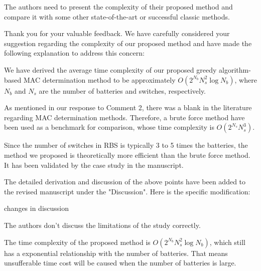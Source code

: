 \documentclass[12pt,american]{scrartcl}
\begin{document}
\begin{revcomment}
  The authors need to present the complexity of their proposed method and compare it with some other state-of-the-art or successful classic methods.
\end{revcomment}
\begin{revresponse}

Thank you for your valuable feedback. We have carefully considered your suggestion regarding the complexity of our proposed method and have made the following explanation to address this concern:


We have derived the average time complexity of our proposed greedy algorithm-based MAC determination method to be approximately $O(2^{N_b}N_s^2\log N_b)$, where $N_b$ and $N_s$ are the number of batteries and switches, respectively.


As mentioned in our response to Comment 2, there was a blank in the literature regarding MAC determination methods.
Therefore, a brute force method have been used as a benchmark for comparison, whose time complexity is $O(2^{N_s}N_s^3)$.


Since the number of switches in RBS is typically 3 to 5 times the batteries\cite{ciNovelDesignAdaptive2007,alahmadBatterySwitchArray2008,kimDependableEfficientScalable2010b,kimBalancedReconfigurationStorage2011a,taesickimSeriesconnectedSelfreconfigurableMulticell2012a,6843711}, the method we proposed is theoretically more efficient than the brute force method.
It has been validated by the case study in the manuscript.


The detailed derivation and discussion of the above points have been added to the revised manuscript under the "Discussion".
Here is the specific modification:
\begin{changes}
  changes in discussion
\end{changes}

\end{revresponse}

\begin{revcomment}
  The authors don't discuss the limitations of the study correctly.
\end{revcomment}
\begin{revresponse}

The time complexity of the proposed method is $O(2^{N_b}N_s^2\log N_b)$, which still has a exponential relationship with the number of batteries.
That means unsufferable time cost will be caused when the number of batteries is large.
  
\end{revresponse}
\end{document}
